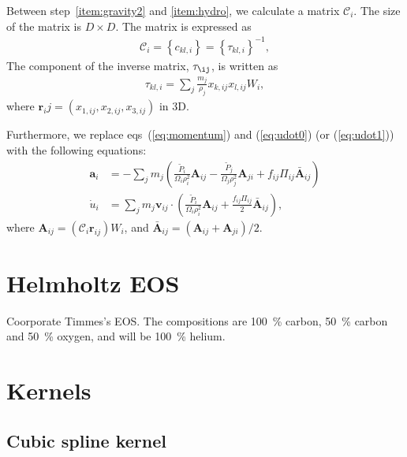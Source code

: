 \documentclass[fleqn,dvipdfmx]{article}
\begin{document}
Between step~\ref{item:gravity2} and \ref{item:hydro}, we calculate a
matrix $\mathcal{C}_i$. The size of the matrix is $D \times D$. The
matrix is expressed as
\begin{align}
  \mathcal{C}_i = \left\{ c_{kl,i} \right\} = \left\{ \tau_{kl,i}
  \right\}^{-1},
\end{align}
The component of the inverse matrix, $\tau_{\ij}$, is written as
\begin{align}
  \tau_{kl,i} = \sum_j \frac{m_j}{\rho_j} x_{k,ij} x_{l,ij} W_i,
\end{align}
where $\bm{r}_ij = (x_{1,ij}, x_{2,ij}, x_{3,ij})$ in 3D.

Furthermore, we replace eqs~(\ref{eq:momentum}) and (\ref{eq:udot0})
(or (\ref{eq:udot1})) with the following equations:
\begin{align}
  \bm{a}_i &= - \sum_j m_j \left( \frac{\tilde{P}_i}{\Omega_i
    \rho_i^2} \bm{A}_{ij} - \frac{\tilde{P}_j}{\Omega_j \rho_j^2}
  \bm{A}_{ji} + f_{ij} \Pi_{ij} \bar{\bm{A}}_{ij} \right) \\
  \dot{u}_i &= \sum_j m_j \bm{v}_{ij} \cdot \left(
  \frac{\tilde{P}_i}{\Omega_i \rho_i^2} \bm{A}_{ij} +
  \frac{f_{ij}\Pi_{ij}}{2} \bar{\bm{A}}_{ij} \right),
\end{align}
where $\bm{A}_{ij}=\left( \mathcal{C}_i \bm{r}_{ij} \right) W_i$, and
$\bar{\bm{A}}_{ij}=\left( \bm{A}_{ij} + \bm{A}_{ji} \right)/2$.

\section{Helmholtz EOS}

Coorporate Timmes's EOS. The compositions are 100~\% carbon, 50~\%
carbon and 50~\% oxygen, and will be 100~\% helium.

\appendix

\section{Kernels}
\label{sec:kernels}

\subsection{Cubic spline kernel}
\end{document}
